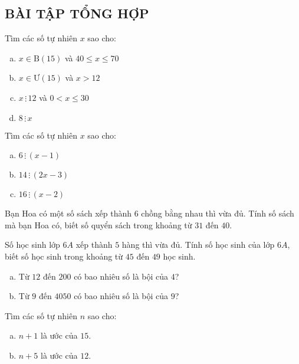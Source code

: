 \begin{bt}
\subsection{BÀI TẬP TỔNG HỢP}
\end{bt}   \begin{bt}
Tìm các số tự nhiên $x$ sao cho:
\begin{enumerate}[a)]
\item $x \in \text{B}\left( 15 \right)$ và $40 \le x \le 70$
\item $x \in \text{Ư}\left( 15 \right)$ và $x > 12$
\item $x \,\vdots\, 12$ và $0 < x \le 30$
\item $8 \,\vdots \,x$
\end{enumerate}
\end{bt}   \begin{bt}
Tìm các số tự nhiên $x$ sao cho:
\begin{enumerate}[a)]
\item $6 \,\vdots\, \left( {x - 1} \right)$
\item $14 \,\vdots \,\left( {2x - 3} \right)$
\item $16 \,\vdots\, \left( {x - 2} \right)$
\end{enumerate}
\end{bt}   \begin{bt}
Bạn Hoa có một số sách xếp thành $6$ chồng bằng nhau thì vừa đủ. Tính số sách mà bạn Hoa có, biết số quyển sách trong khoảng từ $31$  đến $40$.
\end{bt}   \begin{bt}
Số học sinh lớp $6A$ xếp thành $5$ hàng thì vừa đủ. Tính số học sinh của lớp $6A$, biết số học sinh trong khoảng từ $45$ đến $49$ học sinh.
\end{bt}   \begin{bt} \qquad
\begin{enumerate}[a)]
\item Từ $12$ đến $200$ có bao nhiêu số là bội của $4$? 
\item Từ $9$ đến $4050$ có bao nhiêu số là bội của $9$?
\end{enumerate}
\end{bt}   \begin{bt}
Tìm các số tự nhiên $n$ sao cho:
\begin{enumerate}[a)]
\item $n + 1$ là ước của $15$.
\item $n + 5$ là ước của $12$.
\end{enumerate}
\end{bt}